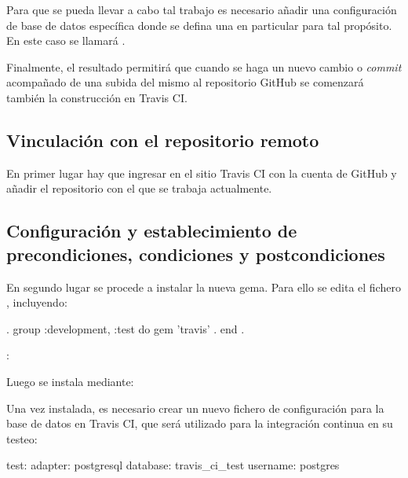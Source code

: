 Para que se pueda llevar a cabo tal trabajo es necesario añadir una configuración de base de datos específica donde se defina una en particular para tal propósito. En este caso se llamará .

Finalmente, el resultado permitirá que cuando se haga un nuevo cambio o \textit{commit} acompañado de una subida del mismo al repositorio GitHub se comenzará también la construcción en Travis CI.

\subsection{Vinculación con el repositorio remoto}

En primer lugar hay que ingresar en el sitio Travis CI con la cuenta de GitHub y añadir el repositorio con el que se trabaja actualmente.

\subsection{Configuración y establecimiento de precondiciones, condiciones y postcondiciones}

En segundo lugar se procede a instalar la nueva gema. Para ello se edita el fichero , incluyendo:

\begin{codelisting}
\label{code:addtravis}
\begin{code}
.
group :development, :test do
  gem 'travis'
.
end
.
\end{code}
\end{codelisting}: 

Luego se instala mediante:


Una vez instalada, es necesario crear un nuevo fichero de configuración para la base de datos en Travis CI, que será utilizado para la integración continua en su testeo:
\begin{codelisting}
\label{code:travisdatabase}
\begin{code}
test:
  adapter: postgresql
  database: travis_ci_test
  username: postgres
\end{code}
\end{codelisting}

